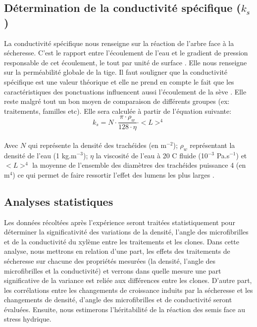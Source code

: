 \documentclass[a4paper,12pt]{report}
\begin{document}
\subsection*{Détermination de la conductivité spécifique ($k_{s}$)}
La conductivité spécifique nous renseigne sur la réaction de l'arbre face à la sécheresse. C'est le rapport entre l’écoulement de l’eau et le gradient de pression responsable de cet écoulement, le tout par unité de surface \citep{Tyree1991}. Elle nous renseigne sur la perméabilité globale de la tige. Il faut souligner que la conductivité spécifique est une valeur théorique et elle ne prend en compte le fait que les caractéristiques des ponctuations influencent aussi l'écoulement de la sève \citep{Pothier1989}. %
Elle reste malgré tout un bon moyen de comparaison de différents groupes (ex: traitements, familles etc).  Elle sera calculée à partir de l'équation suivante: \\

\begin{equation}\label{eq:2}
k_{s} = N\cdot \frac{\pi \cdot \rho_{w}}{128 \cdot \eta} \cdot <L>^{4}
\end{equation}\\

Avec $N$ qui représente la densité des trachéides (en m$^{-2}$); $\rho_{w}$ représentant la densité de l'eau (1 kg.m$^{-3}$); $\eta$ la viscosité de l'eau à 20  \textdegree C fluide (10$^{-3}$ Pa.s$^{-1}$) et $<L>^{4}$ la moyenne de l'ensemble des diamètres des trachéides puissance 4 (en m$^{4}$) ce qui permet de faire ressortir l'effet des lumens les plus larges \citep{Tyree1991}.


\subsection*{Analyses statistiques}
Les données récoltées après l'expérience seront traitées statistiquement pour déterminer la significativité des variations de la densité, l'angle des microfibrilles et de la conductivité du xylème entre les traitements et les clones. Dans cette analyse, nous mettrons en relation d'une part, les effets des traitements de sécheresse sur chacune des propriétés mesurées (la densité, l'angle des microfibrilles et la conductivité) et verrons dans quelle mesure une part significative de la variance est reliée aux différences entre les clones. D'autre part, les corrélations entre les changements de croissance induits par la sécheresse et les changements de densité, d'angle des microfibrilles et de conductivité seront évaluées. Ensuite, nous estimerons l'héritabilité de la réaction des semis face au stress hydrique. \\ 
\end{document}
